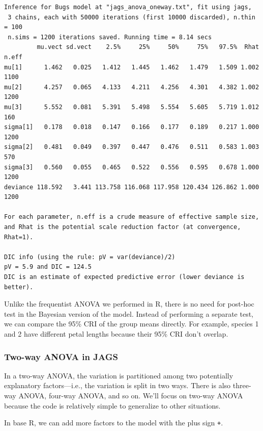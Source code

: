 \documentclass[
  13,
  letterpaper,
]{report}
\begin{document}
\begin{verbatim}
Inference for Bugs model at "jags_anova_oneway.txt", fit using jags,
 3 chains, each with 50000 iterations (first 10000 discarded), n.thin = 100
 n.sims = 1200 iterations saved. Running time = 8.14 secs
         mu.vect sd.vect    2.5%     25%     50%     75%   97.5%  Rhat n.eff
mu[1]      1.462   0.025   1.412   1.445   1.462   1.479   1.509 1.002  1100
mu[2]      4.257   0.065   4.133   4.211   4.256   4.301   4.382 1.002  1200
mu[3]      5.552   0.081   5.391   5.498   5.554   5.605   5.719 1.012   160
sigma[1]   0.178   0.018   0.147   0.166   0.177   0.189   0.217 1.000  1200
sigma[2]   0.481   0.049   0.397   0.447   0.476   0.511   0.583 1.003   570
sigma[3]   0.560   0.055   0.465   0.522   0.556   0.595   0.678 1.000  1200
deviance 118.592   3.441 113.758 116.068 117.958 120.434 126.862 1.000  1200

For each parameter, n.eff is a crude measure of effective sample size,
and Rhat is the potential scale reduction factor (at convergence, Rhat=1).

DIC info (using the rule: pV = var(deviance)/2)
pV = 5.9 and DIC = 124.5
DIC is an estimate of expected predictive error (lower deviance is better).
\end{verbatim}

Unlike the frequentist ANOVA we performed in R, there is no need for
post-hoc test in the Bayesian version of the model. Instead of
performing a separate test, we can compare the 95\% CRI of the group
means directly. For example, species 1 and 2 have different petal
lengths because their 95\% CRI don't overlap.

\subsubsection{Two-way ANOVA in JAGS}\label{two-way-anova-in-jags}

In a two-way ANOVA, the variation is partitioned among two potentially
explanatory factors---i.e., the variation is split in two ways. There is
also three-way ANOVA, four-way ANOVA, and so on. We'll focus on two-way
ANOVA because the code is relatively simple to generalize to other
situations.

In base R, we can add more factors to the model with the plus sign
\texttt{+}.
\end{document}
